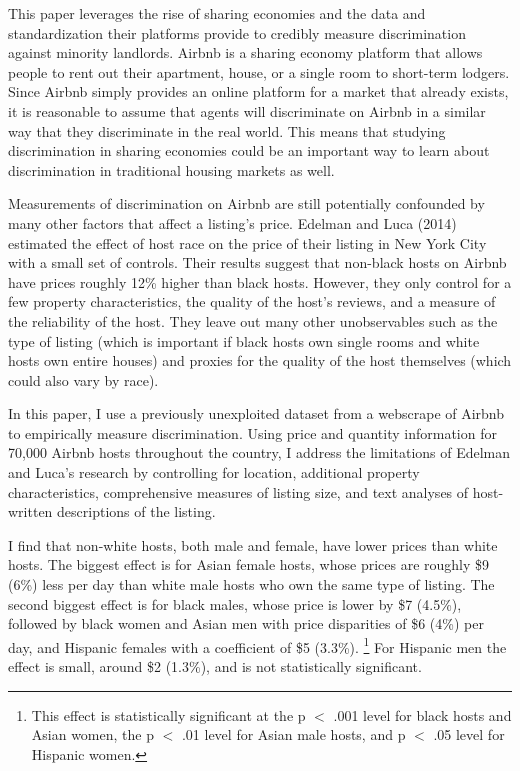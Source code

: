This paper leverages the rise of sharing economies and the data and standardization their platforms provide to credibly measure discrimination against minority landlords. Airbnb is a sharing economy platform that allows people to rent out their apartment, house, or a single room to short-term lodgers. Since Airbnb simply provides an online platform for a market that already exists, it is reasonable to assume that agents will discriminate on Airbnb in a similar way that they discriminate in the real world. This means that studying discrimination in sharing economies could be an important way to learn about discrimination in traditional housing markets as well.

Measurements of discrimination on Airbnb are still potentially confounded by many other factors that affect a listing's price. Edelman and Luca (2014) estimated the effect of host race on the price of their listing in New York City with a small set of controls. Their results suggest that non-black hosts on Airbnb have prices roughly 12\% higher than black hosts. However, they only control for a few property characteristics, the quality of the host's reviews, and a measure of the reliability of the host. They leave out many other unobservables such as the type of listing (which is important if black hosts own single rooms and white hosts own entire houses) and proxies for the quality of the host themselves (which could also vary by race). 

In this paper, I use a previously unexploited dataset from a webscrape of Airbnb to empirically measure discrimination. Using price and quantity information for 70,000 Airbnb hosts throughout the country, I address the limitations of Edelman and Luca's research by controlling for location, additional property characteristics, comprehensive measures of listing size, and text analyses of host-written descriptions of the listing. 

I find that non-white hosts, both male and female, have lower prices than white hosts. The biggest effect is for Asian female hosts, whose prices are roughly \$9 (6\%) less per day than white male hosts who own the same type of listing. The second biggest effect is for black males, whose price is lower by \$7 (4.5\%), followed by black women and Asian men with price disparities of \$6 (4\%) per day, and Hispanic females with a coefficient of \$5 (3.3\%).%
	\footnote{This effect is statistically significant at the p $<$ .001 level for black hosts and Asian women, the p $<$ .01 level for Asian male hosts, and p $<$ .05 level for Hispanic women.} 
For Hispanic men the effect is small, around \$2 (1.3\%), and is not statistically significant. 

